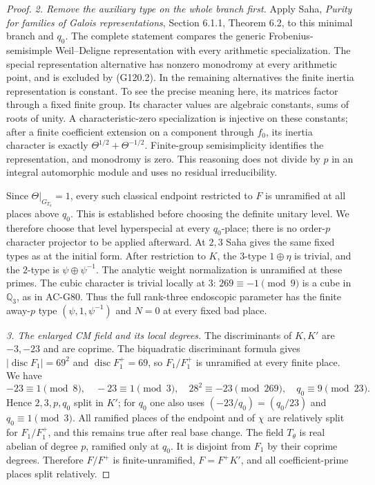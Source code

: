 \begin{proof}
\emph{2. Remove the auxiliary type on the whole branch first.}
Apply Saha, \emph{Purity for families of Galois representations},
Section 6.1.1, Theorem 6.2, to this minimal branch and $q_0$.
The complete statement compares the generic Frobenius-semisimple
Weil--Deligne representation with every arithmetic specialization.
The special representation alternative has nonzero monodromy at
every arithmetic point, and is excluded by (G120.2).
In the remaining alternatives the finite inertia representation
is constant.  To see the precise meaning here, its matrices factor
through a fixed finite group.  Its character values are algebraic
constants, sums of roots of unity.  A characteristic-zero
specialization is injective on these constants; after a finite
coefficient extension on a component through $f_0$, its inertia
character is exactly $\Theta^{1/2}+\Theta^{-1/2}$.
Finite-group semisimplicity identifies the representation, and
monodromy is zero.  This reasoning does not divide by $p$ in an
integral automorphic module and uses no residual irreducibility.

Since $\Theta|_{G_{T_\theta}}=1$, every such classical endpoint
restricted to $F$ is unramified at all places above $q_0$.
This is established before choosing the definite unitary level.
We therefore choose that level hyperspecial at every $q_0$-place;
there is no order-$p$ character projector to be applied afterward.
At $2,3$ Saha gives the same fixed types as at the initial form.
After restriction to $K$, the $3$-type $1\oplus\eta$ is trivial,
and the $2$-type is $\psi\oplus\psi^{-1}$.
The analytic weight normalization is unramified at these primes.
The cubic character is trivial locally at $3$: $269\equiv-1\pmod9$
is a cube in $\mathbb Q_3$, as in AC-G80.
Thus the full rank-three endoscopic parameter has the finite
away-$p$ type $(\psi,1,\psi^{-1})$ and $N=0$ at every fixed bad place.

\emph{3. The enlarged CM field and its local degrees.}
The discriminants of $K,K'$ are $-3,-23$ and are coprime.
The biquadratic discriminant formula gives
$|\operatorname{disc}F_1|=69^2$ and
$\operatorname{disc}F_1^+=69$, so $F_1/F_1^+$ is unramified
at every finite place.  We have
\[
 -23\equiv1\pmod8,\quad -23\equiv1\pmod3,\quad
 28^2\equiv-23\pmod{269},\quad q_0\equiv9\pmod{23}.
                                                                    \tag{G120.11}
\]
Hence $2,3,p,q_0$ split in $K'$; for $q_0$ one also uses
$(-23/q_0)=(q_0/23)$ and $q_0\equiv1\pmod3$.
All ramified places of the endpoint and of $\chi$ are relatively
split for $F_1/F_1^+$, and this remains true after real base change.
The field $T_\theta$ is real abelian of degree $p$, ramified only
at $q_0$.  It is disjoint from $F_1$ by their coprime degrees.
Therefore $F/F^+$ is finite-unramified, $F=F^+K'$, and all
coefficient-prime places split relatively.


\end{proof}
